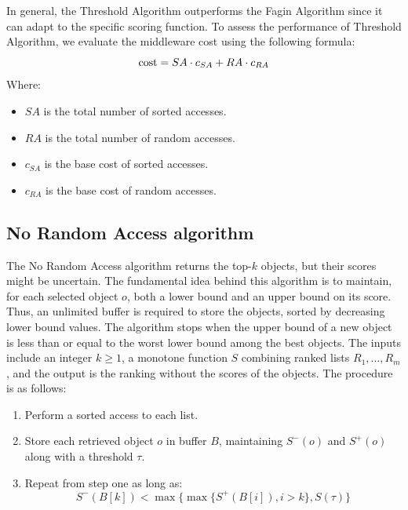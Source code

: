 In general, the Threshold Algorithm outperforms the Fagin Algorithm since it can adapt to the specific scoring function. 
To assess the performance of Threshold Algorithm, we evaluate the middleware cost using the following formula:
\[\textnormal{cost} = SA \cdot c_{SA} + RA \cdot c_{RA}\]
Where:
\begin{itemize}
    \item $SA$ is the total number of sorted accesses.
    \item $RA$ is the total number of random accesses.
    \item $c_{SA}$ is the base cost of sorted accesses.
    \item $c_{RA}$ is the base cost of random accesses.
\end{itemize}

\subsection{No Random Access algorithm}
The No Random Access algorithm returns the top-$k$ objects, but their scores might be uncertain. 
The fundamental idea behind this algorithm is to maintain, for each selected object $o$, both a lower bound and an upper bound on its score.
Thus, an unlimited buffer is required to store the objects, sorted by decreasing lower bound values.
The algorithm stops when the upper bound of a new object is less than or equal to the worst lower bound among the best objects.
The inputs include an integer $k \geq 1$, a monotone function $S$ combining ranked lists $R_1, \dots, R_m$, and the output is the ranking without the scores of the objects. 
The procedure is as follows:
\begin{enumerate}
    \item Perform a sorted access to each list.
    \item Store each retrieved object $o$ in buffer $B$, maintaining $S^{-}(o)$ and $S^{+}(o)$ along with a threshold $\tau$.
    \item Repeat from step one as long as:
        \[S^{-}(B[k])<\max\{\max\{S^{+}(B[i]),i>k\},S(\tau)\}\]
\end{enumerate}
